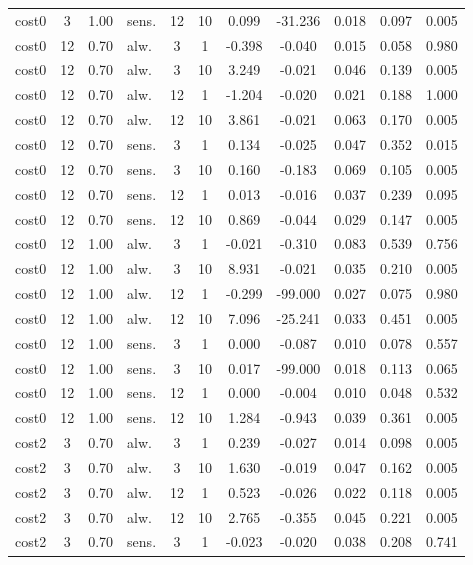 \begin{scriptsize}
\begin{longtable}{l cclcc ccccc}
cost0 & 3 & 1.00 & sens. & 12 & 10 & 0.099 & -31.236 & 0.018 & 0.097 & 0.005 \\
cost0 & 12 & 0.70 & alw. & 3 & 1 & -0.398 & -0.040 & 0.015 & 0.058 & 0.980 \\
cost0 & 12 & 0.70 & alw. & 3 & 10 & 3.249 & -0.021 & 0.046 & 0.139 & 0.005 \\
cost0 & 12 & 0.70 & alw. & 12 & 1 & -1.204 & -0.020 & 0.021 & 0.188 & 1.000 \\
cost0 & 12 & 0.70 & alw. & 12 & 10 & 3.861 & -0.021 & 0.063 & 0.170 & 0.005 \\
cost0 & 12 & 0.70 & sens. & 3 & 1 & 0.134 & -0.025 & 0.047 & 0.352 & 0.015 \\
cost0 & 12 & 0.70 & sens. & 3 & 10 & 0.160 & -0.183 & 0.069 & 0.105 & 0.005 \\
cost0 & 12 & 0.70 & sens. & 12 & 1 & 0.013 & -0.016 & 0.037 & 0.239 & 0.095 \\
cost0 & 12 & 0.70 & sens. & 12 & 10 & 0.869 & -0.044 & 0.029 & 0.147 & 0.005 \\
cost0 & 12 & 1.00 & alw. & 3 & 1 & -0.021 & -0.310 & 0.083 & 0.539 & 0.756 \\
cost0 & 12 & 1.00 & alw. & 3 & 10 & 8.931 & -0.021 & 0.035 & 0.210 & 0.005 \\
cost0 & 12 & 1.00 & alw. & 12 & 1 & -0.299 & -99.000 & 0.027 & 0.075 & 0.980 \\
cost0 & 12 & 1.00 & alw. & 12 & 10 & 7.096 & -25.241 & 0.033 & 0.451 & 0.005 \\
cost0 & 12 & 1.00 & sens. & 3 & 1 & 0.000 & -0.087 & 0.010 & 0.078 & 0.557 \\
cost0 & 12 & 1.00 & sens. & 3 & 10 & 0.017 & -99.000 & 0.018 & 0.113 & 0.065 \\
cost0 & 12 & 1.00 & sens. & 12 & 1 & 0.000 & -0.004 & 0.010 & 0.048 & 0.532 \\
cost0 & 12 & 1.00 & sens. & 12 & 10 & 1.284 & -0.943 & 0.039 & 0.361 & 0.005 \\
cost2 & 3 & 0.70 & alw. & 3 & 1 & 0.239 & -0.027 & 0.014 & 0.098 & 0.005 \\
cost2 & 3 & 0.70 & alw. & 3 & 10 & 1.630 & -0.019 & 0.047 & 0.162 & 0.005 \\
cost2 & 3 & 0.70 & alw. & 12 & 1 & 0.523 & -0.026 & 0.022 & 0.118 & 0.005 \\
cost2 & 3 & 0.70 & alw. & 12 & 10 & 2.765 & -0.355 & 0.045 & 0.221 & 0.005 \\
cost2 & 3 & 0.70 & sens. & 3 & 1 & -0.023 & -0.020 & 0.038 & 0.208 & 0.741 \\

\end{longtable}
\end{scriptsize}
